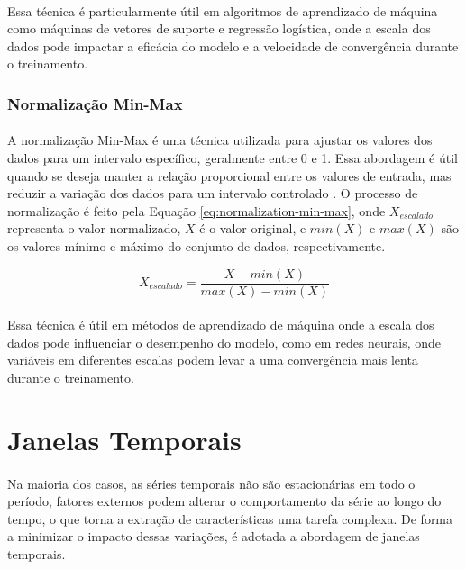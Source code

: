 \paragraph{} Essa técnica é particularmente útil em algoritmos de aprendizado de máquina como máquinas de vetores de suporte e regressão logística, onde a escala dos dados pode impactar a eficácia do modelo e a velocidade de convergência durante o treinamento.

\subsubsection{Normalização Min-Max}
\paragraph{} A normalização Min-Max é uma técnica utilizada para ajustar os valores dos dados para um intervalo específico, geralmente entre 0 e 1. Essa abordagem é útil quando se deseja manter a relação proporcional entre os valores de entrada, mas reduzir a variação dos dados para um intervalo controlado \cite{geeksforgeeks_scaler}. O processo de normalização é feito pela Equação \ref{eq:normalization-min-max}, onde \(X_{escalado}\) representa o valor normalizado, \(X\) é o valor original, e \(min(X)\) e \(max(X)\) são os valores mínimo e máximo do conjunto de dados, respectivamente.

\begin{equation}
	X_{escalado} = \frac{X - min(X)}{max(X) - min(X)}
	\label{eq:normalization-min-max}
\end{equation}

\paragraph{} Essa técnica é útil em métodos de aprendizado de máquina onde a escala dos dados pode influenciar o desempenho do modelo, como em redes neurais, onde variáveis em diferentes escalas podem levar a uma convergência mais lenta durante o treinamento.


\section{Janelas Temporais}


\paragraph{} Na maioria dos casos, as séries temporais não são estacionárias em todo o período, fatores externos podem alterar o comportamento da série ao longo do tempo, o que torna a extração de características uma tarefa complexa. De forma a minimizar o impacto dessas variações, é adotada a abordagem de janelas temporais.

